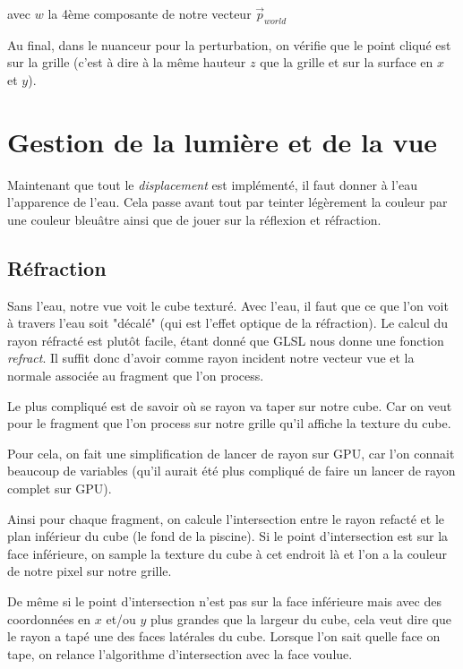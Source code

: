 \documentclass[a4paper,11pt,leqno]{article}
\begin{document}
avec $w$ la 4ème composante de notre vecteur $\overrightarrow{p}_{world}$

Au final, dans le nuanceur pour la perturbation, on vérifie que le point cliqué est sur la grille (c'est à dire à la même hauteur $z$ que la grille et sur la surface en $x$ et $y$).

\section{Gestion de la lumière et de la vue}

Maintenant que tout le \emph{displacement} est implémenté, il faut donner à l'eau l'apparence de l'eau. Cela passe avant tout par teinter légèrement la couleur par une couleur bleuâtre ainsi que de jouer sur la réflexion et réfraction.

\subsection{Réfraction}

Sans l'eau, notre vue voit le cube texturé. Avec l'eau, il faut que ce que l'on voit à travers l'eau soit "décalé" (qui est l'effet optique de la réfraction). Le calcul du rayon réfracté est plutôt facile, étant donné que GLSL nous donne une fonction \emph{refract}. Il suffit donc d'avoir comme rayon incident notre vecteur vue et la normale associée au fragment que l'on process.

Le plus compliqué est de savoir où se rayon va taper sur notre cube. Car on veut pour le fragment que l'on process sur notre grille qu'il affiche la texture du cube.

Pour cela, on fait une simplification de lancer de rayon sur GPU, car l'on connait beaucoup de variables (qu'il aurait été plus compliqué de faire un lancer de rayon complet sur GPU).

Ainsi pour chaque fragment, on calcule l'intersection entre le rayon refacté et le plan inférieur du cube (le fond de la piscine). Si le point d'intersection est sur la face inférieure, on sample la texture du cube à cet endroit là et l'on a la couleur de notre pixel sur notre grille.

De même si le point d'intersection n'est pas sur la face inférieure mais avec des coordonnées en $x$ et/ou $y$ plus grandes que la largeur du cube, cela veut dire que le rayon a tapé une des faces latérales du cube. Lorsque l'on sait quelle face on tape, on relance l'algorithme d'intersection avec la face voulue.
\end{document}
